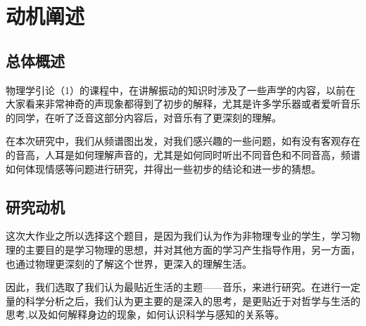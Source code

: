 \chapter{动机阐述}
\section{总体概述}
物理学引论（1）的课程中，在讲解振动的知识时涉及了一些声学的内容，以前在大家看来非常神奇的声现象都得到了初步的解释，尤其是许多学乐器或者爱听音乐的同学，在听了泛音这部分内容后，对音乐有了更深刻的理解。
\par
在本次研究中，我们从频谱图出发，对我们感兴趣的一些问题，如有没有客观存在的音高，人耳是如何理解声音的，尤其是如何同时听出不同音色和不同音高，频谱如何体现情感等问题进行研究，并得出一些初步的结论和进一步的猜想。
\section{研究动机}
这次大作业之所以选择这个题目，是因为我们认为作为非物理专业的学生，学习物理的主要目的是学习物理的思想，并对其他方面的学习产生指导作用，另一方面，也通过物理更深刻的了解这个世界，更深入的理解生活。
\par
因此，我们选取了我们认为最贴近生活的主题——音乐，来进行研究。在进行一定量的科学分析之后，我们认为更主要的是深入的思考，是更贴近于对哲学与生活的思考,以及如何解释身边的现象，如何认识科学与感知的关系等。
